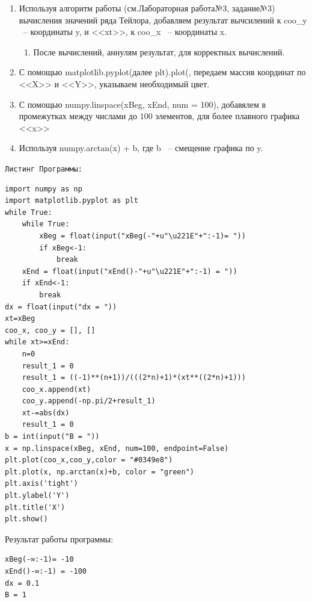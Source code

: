 \documentclass[a4paper]{article}
\begin{document}
\begin{lab1}
\begin{algoritm}
\begin{enumerate}
            \item 
                Используя алгоритм работы (см.Лабораторная работа№3, задание№3) вычисления значений ряда Тейлора, добавляем результат вычсилений к coo\_y ~-- координаты y, и <<xt>>, к coo\_x ~-- координаты x.
            \begin{enumerate}
                \item 
                    После вычислений, аннулям результат, для корректных вычислений.
            \end{enumerate}
            \item 
                С помощью matplotlib.pyplot(далее plt).plot(\underline{\hspace{10mm}}, передаем массив координат по <<X>> и <<Y>>, указываем необходимый цвет.
            \item 
                С помощью numpy.linspace(xBeg, xEnd, num = 100), добавялем в промежутках между числами до 100 элементов, для более плавного графика <<x>>
            \item 
                Используя numpy.arctan(x) + b, где b ~-- смещение графика по y.
        \end{enumerate}
    \end{algoritm}
        \texttt{Листинг Программы:}
    \begin{verbatim}
import numpy as np
import matplotlib.pyplot as plt
while True:
    while True:
        xBeg = float(input("xBeg(-"+u"\u221E"+":-1)= "))
        if xBeg<-1:
            break
    xEnd = float(input("xEnd()-"+u"\u221E"+":-1) = "))
    if xEnd<-1:
        break
dx = float(input("dx = "))
xt=xBeg
coo_x, coo_y = [], []
while xt>=xEnd:
    n=0
    result_1 = 0
    result_1 = ((-1)**(n+1))/(((2*n)+1)*(xt**((2*n)+1)))
    coo_x.append(xt)
    coo_y.append(-np.pi/2+result_1)
    xt-=abs(dx)
    result_1 = 0
b = int(input("B = "))
x = np.linspace(xBeg, xEnd, num=100, endpoint=False)
plt.plot(coo_x,coo_y,color = "#0349e8")
plt.plot(x, np.arctan(x)+b, color = "green")
plt.axis('tight')
plt.ylabel('Y')
plt.title('X')
plt.show()
    \end{verbatim}
    \begin{center}
        Результат работы программы:
    \end{center}
    \begin{verbatim}
xBeg(-∞:-1)= -10
xEnd()-∞:-1) = -100
dx = 0.1 
B = 1
    \end{verbatim}

\end{lab1}
\end{document}
